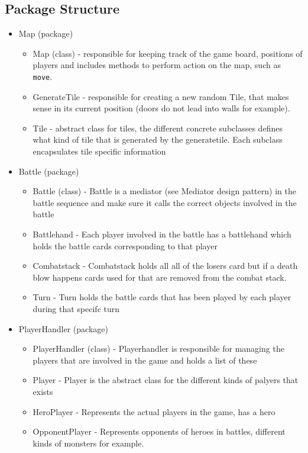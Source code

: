 \subsection{Package Structure}
\label{packagestructure}
\begin{itemize}
\item
Map (package)
	\begin{itemize}
	\item
	Map (class) - responsible for keeping track of the game board, positions of players and includes methods to perform action on the map, such as \texttt{move}.
	\item
	GenerateTile - responsible for creating a new random Tile, that makes sense in its current position (doors do not lead into walls for example).
	\item
	Tile - abstract class for tiles, the different concrete subclasses defines what kind of tile that is generated by the generatetile. Each subclass encapsulates 	 tile specific information    
	\end{itemize}
\item
Battle (package)
	\begin{itemize}
	\item
	Battle (class) - Battle is a mediator (see Mediator design pattern) in the battle sequence and make sure it calls the correct objects involved in the battle
	\item
	Battlehand - Each player involved in the battle has a battlehand which holds the battle cards corresponding to that player
	\item
	Combatstack - Combatstack holds all all of the losers card but if a death blow happens cards used for that are removed from the combat stack.  
	\item
	Turn - Turn holds the battle cards that has been played by each player during that specifc turn
	\end{itemize}
\item
PlayerHandler (package)
	\begin{itemize}
	\item
	PlayerHandler (class) - Playerhandler is responsible for managing the players that are involved in the game and holds a list of these  
	\item
	Player - Player is the abstract class for the different kinds of palyers that exists
	\item
	HeroPlayer - Represents the actual players in the game, has a hero     
	\item
	OpponentPlayer - Represents opponents of heroes in battles, different kinds of monsters for example.

\end{itemize}
\end{itemize}
